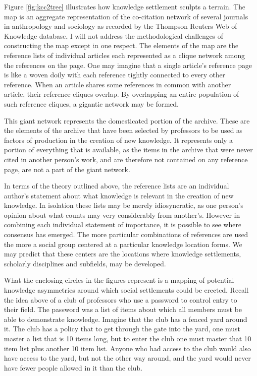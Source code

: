 \documentclass[]{book}
\theoremstyle{definition}
\theoremstyle{definition}
\theoremstyle{definition}
\theoremstyle{remark}
\begin{document}
Figure \ref{fig:kcc2tree} illustrates how knowledge settlement sculpts a
terrain. The map is an aggregate representation of the co-citation
network of several journals in anthropology and sociology as recorded by
the Thompson Reuters Web of Knowledge database. I will not address the
methodological challenges of constructing the map except in one respect.
The elements of the map are the reference lists of individual articles
each represented as a clique network among the references on the page.
One may imagine that a single article's reference page is like a woven
doily with each reference tightly connected to every other reference.
When an article shares some references in common with another article,
their reference cliques overlap. By overlapping an entire population of
such reference cliques, a gigantic network may be formed.

This giant network represents the domesticated portion of the archive.
These are the elements of the archive that have been selected by
professors to be used as factors of production in the creation of new
knowledge. It represents only a portion of everything that is available,
as the items in the archive that were never cited in another person's
work, and are therefore not contained on any reference page, are not a
part of the giant network.

In terms of the theory outlined above, the reference lists are an
individual author's statement about what knowledge is relevant in the
creation of new knowledge. In isolation these lists may be merely
idiosyncratic, as one person's opinion about what counts may very
considerably from another's. However in combining each individual
statement of importance, it is possible to see where consensus has
emerged. The more particular combinations of references are used the
more a social group centered at a particular knowledge location forms.
We may predict that these centers are the locations where knowledge
settlements, scholarly disciplines and subfields, may be developed.

What the enclosing circles in the figures represent is a mapping of
potential knowledge asymmetries around which social settlements could be
erected. Recall the idea above of a club of professors who use a
password to control entry to their field. The password was a list of
items about which all members must be able to demonstrate knowledge.
Imagine that the club has a fenced yard around it. The club has a policy
that to get through the gate into the yard, one must master a list that
is 10 items long, but to enter the club one must master that 10 item
list plus another 10 item list. Anyone who had access to the club would
also have access to the yard, but not the other way around, and the yard
would never have fewer people allowed in it than the club.
\end{document}
